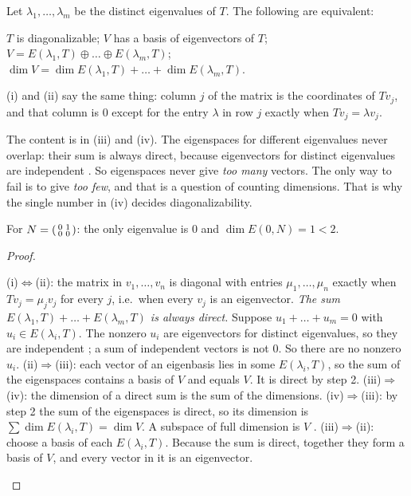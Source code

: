 \documentclass[10pt]{scrartcl}
\begin{document}
\begin{theorem*}\hypertarget{prop-62}{}\label{prop-62}
  Let $\lambda_1,\dots,\lambda_m$ be the distinct eigenvalues of $T$. The following are equivalent:
  \begin{enumerate}[(i)]
    \ii $T$ is diagonalizable;
    \ii $V$ has a basis of eigenvectors of $T$;
    \ii $V=E(\lambda_1,T)\oplus\dots\oplus E(\lambda_m,T)$;
    \ii $\dim V=\dim E(\lambda_1,T)+\dots+\dim E(\lambda_m,T)$.
  \end{enumerate}
\end{theorem*}
\begin{ideabox}
(i) and (ii) say the same thing: column $j$ of the matrix is the coordinates of $Tv_j$, and that column is $0$ except for the entry $\lambda$ in row $j$ exactly when $Tv_j=\lambda v_j$.

The content is in (iii) and (iv). The eigenspaces for different eigenvalues never overlap: their sum is always direct, because eigenvectors for distinct eigenvalues are independent . So eigenspaces never give \emph{too many} vectors. The only way to fail is to give \emph{too few}, and that is a question of counting dimensions. That is why the single number in (iv) decides diagonalizability.

For $N=\begin{psmallmatrix}0&1\\0&0\end{psmallmatrix}$: the only eigenvalue is $0$ and $\dim E(0,N)=1<2$.
\end{ideabox}
\begin{proof}
  \begin{steps}
    \ii (i)$\iff$(ii): the matrix in $v_1,\dots,v_n$ is diagonal with entries $\mu_1,\dots,\mu_n$ exactly when $Tv_j=\mu_jv_j$ for every $j$, i.e.\ when every $v_j$ is an eigenvector.
    \ii \emph{The sum $E(\lambda_1,T)+\dots+E(\lambda_m,T)$ is always direct.} Suppose $u_1+\dots+u_m=0$ with $u_i\in E(\lambda_i,T)$. The nonzero $u_i$ are eigenvectors for distinct eigenvalues, so they are independent ; a sum of independent vectors is not $0$. So there are no nonzero $u_i$.
    \ii (ii)$\Rightarrow$(iii): each vector of an eigenbasis lies in some $E(\lambda_i,T)$, so the sum of the eigenspaces contains a basis of $V$ and equals $V$. It is direct by step 2.
    \ii (iii)$\Rightarrow$(iv): the dimension of a direct sum is the sum of the dimensions.
    \ii (iv)$\Rightarrow$(iii): by step 2 the sum of the eigenspaces is direct, so its dimension is $\sum\dim E(\lambda_i,T)=\dim V$. A subspace of full dimension is $V$ .
    \ii (iii)$\Rightarrow$(ii): choose a basis of each $E(\lambda_i,T)$. Because the sum is direct, together they form a basis of $V$, and every vector in it is an eigenvector.
  \end{steps}
\end{proof}
\end{document}
